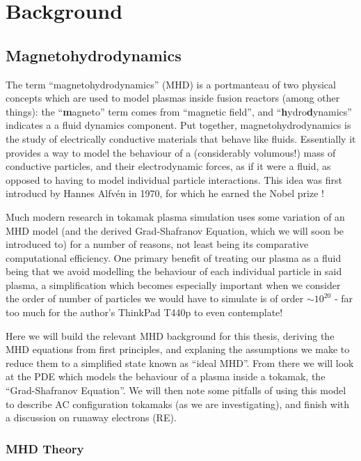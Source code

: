 
\chapter{Background}
\label{chapter2}

\section{Magnetohydrodynamics}


The term ``magnetohydrodynamics'' (MHD) is a portmanteau of two physical concepts which are used to model plasmas 
inside fusion reactors (among other things): the ``\textbf{m}agneto'' term comes from ``magnetic field'', and ``\textbf{h}ydro\textbf{d}ynamics'' indicates a 
a fluid dynamics component. Put together, magnetohydrodynamics is the study of electrically conductive materials 
that behave like fluids. Essentially it provides a way to model the behaviour of a (considerably volumous!) 
mass of conductive particles, and their electrodynamic forces, as if it were a fluid, as opposed to having to model 
individual particle interactions. This idea was first introducd by Hannes Alfv\'en in 1970, for which he earned 
the Nobel prize \cite{alfven-mhd}!

Much modern research in tokamak plasma simulation uses some variation of an MHD model (and the derived Grad-Shafranov Equation, which we will 
soon be introduced to) for a number of reasons, not least being its comparative computational efficiency.
One primary benefit of treating our plasma as a fluid being that we avoid modelling the behaviour of 
each individual particle in said plasma, a simplification which becomes especially important when we consider 
the order of number of particles we would have to simulate is of order $\sim 10^{20}$ - far too much 
for the author's ThinkPad T440p to even contemplate!

Here we will build the relevant MHD background for this thesis, deriving the MHD equations from first principles, 
and explaning the assumptions we make to reduce them to a simplified state known as ``ideal MHD''. From there we will 
look at the PDE which models the behaviour of a plasma inside a tokamak, the ``Grad-Shafranov Equation''. We will 
then note some pitfalls of using this model to describe AC configuration tokamaks (as we are investigating), 
and finish with a discussion on runaway electrons (RE).

\subsection{MHD Theory}

